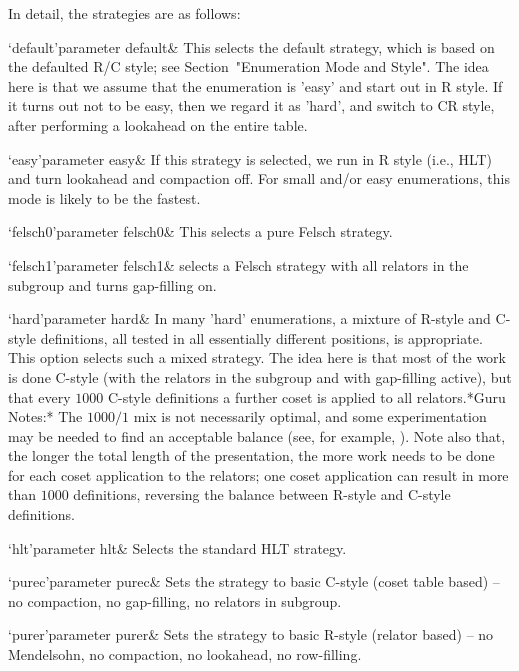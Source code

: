 In detail, the strategies are as follows:

\beginitems

\>`default'{parameter default}&
This selects the default strategy, which is based on the defaulted R/C
style;  see Section~"Enumeration Mode  and Style".   The idea  here is
that  we assume  that the  enumeration is  'easy' and  start out  in R
style.  If it turns  out not to be easy, then we  regard it as 'hard',
and switch  to CR  style, after performing  a lookahead on  the entire
table.

\>`easy'{parameter easy}&
If this strategy  is selected, we run in R style  (i.e., HLT) and turn
lookahead  and compaction  off.  For  small and/or  easy enumerations,
this mode is likely to be the fastest.

\>`felsch0'{parameter felsch0}&
This selects a pure Felsch strategy.


\>`felsch1'{parameter felsch1}&
selects a Felsch strategy with  all relators in the subgroup and turns
gap-filling on.

\>`hard'{parameter hard}&  In many  'hard' enumerations, a  mixture of
R-style  and  C-style  definitions,  all  tested  in  all  essentially
different positions, is appropriate.  This option selects such a mixed
strategy.  The  idea here  is that  most of the  work is  done C-style
(with the relators  in the subgroup and with  gap-filling active), but
that every  $1000$ C-style definitions  a further coset is  applied to
all  relators.*Guru  Notes:*  The  $1000/1$  mix  is  not  necessarily
optimal, and some experimentation may  be needed to find an acceptable
balance (see,  for example, \cite{HR1}).   Note also that,  the longer
the total length  of the presentation, the more work  needs to be done
for each coset application to  the relators; one coset application can
result in more than  $1000$ definitions, reversing the balance between
R-style and C-style definitions.

\>`hlt'{parameter hlt}&
Selects the standard HLT strategy.

\>`purec'{parameter purec}&
Sets  the  strategy  to  basic  C-style  (coset  table  based)  --  no
compaction, no gap-filling, no relators in subgroup.

\>`purer'{parameter purer}&
Sets the strategy  to basic R-style (relator based)  -- no Mendelsohn,
no compaction, no lookahead, no row-filling.

